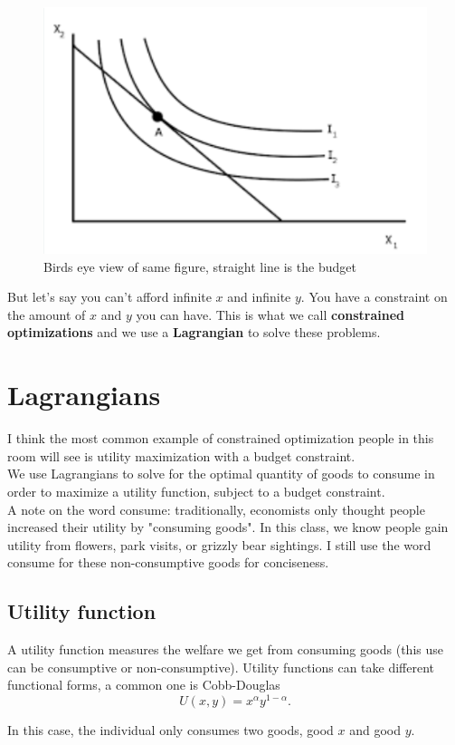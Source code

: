 \documentclass{article}
\begin{document}
\begin{figure}[htp]
    \centering
    \includegraphics[width=0.5\linewidth]{Screen Shot 2023-12-01 at 1.18.52 PM.png}
    \caption{Birds eye view of same figure, straight line is the budget}
    \label{fig:enter-label}
\end{figure}

But let's say you can't afford infinite $x$ and infinite $y$. You have a constraint on the amount of $x$ and $y$ you can have. This is what we call \textbf{constrained optimizations} and we use a \textbf{Lagrangian} to solve these problems. 

\section{Lagrangians}
I think the most common example of constrained optimization people in this room will see is utility maximization with a budget constraint. \\

We use Lagrangians to solve for the optimal quantity of goods to consume in order to maximize a utility function, subject to a budget constraint.\\

A note on the word consume: traditionally, economists only thought people increased their utility by "consuming goods". In this class, we know people gain utility from flowers,  park visits, or grizzly bear sightings. I still use the word consume for these non-consumptive goods for conciseness. 


\subsection{Utility function}
A utility function measures the welfare we get from consuming goods (this use can be consumptive or non-consumptive). Utility functions can take different functional forms, a common one is Cobb-Douglas 
$$U(x,y) = x^\alpha y^{1-\alpha}.$$

In this case, the individual only consumes two goods, good $x$ and good $y$.\\
\end{document}
